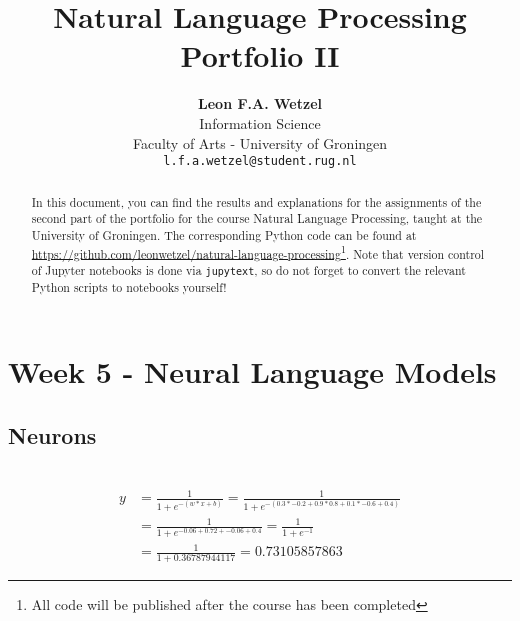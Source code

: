 \documentclass[a4paper, 11pt]{article}
\title{\textbf{Natural Language Processing}\\Portfolio II}
\author{\textbf{Leon F.A. Wetzel}\\ Information Science \\ Faculty of Arts - University of Groningen\\ \texttt{l.f.a.wetzel@student.rug.nl}}
\begin{document}
\maketitle

\begin{abstract}
	
	In this document, you can find the results and explanations for the assignments of the second part of the portfolio for the course Natural Language Processing, taught at the University of Groningen. The corresponding Python code can be found at \url{https://github.com/leonwetzel/natural-language-processing}\footnote{All code will be published after the course has been completed}. Note that version control of Jupyter notebooks is done via \texttt{jupytext}, so do not forget to convert the relevant Python scripts to notebooks yourself!

\end{abstract}

\section{Week 5 - Neural Language Models}

\subsection{Neurons}

\noindent{}\\


\begin{equation} \label{eq1}
	\begin{split}
		y & = \frac{1}{1 + e^{-(w*x+b)}} = \frac{1}{1+e^{-(0.3*-0.2 + 0.9*0.8 + 0.1*-0.6 + 0.4)}} \\
		& = \frac{1}{1 + e^{-0.06 + 0.72 + -0.06 + 0.4}} = \frac{1}{1 + e^{-1}} \\
		& = \frac{1}{1 + 0.36787944117} = 0.73105857863
	\end{split}
\end{equation}
\end{document}
